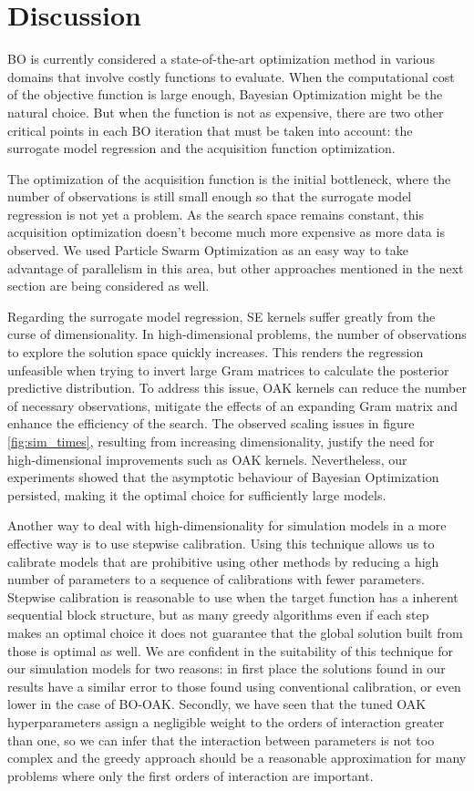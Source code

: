 \documentclass{IOS-Book-Article}
\begin{document}
	\section{Discussion}
	BO is currently considered a state-of-the-art optimization method in various domains that involve costly functions to evaluate. When the computational cost of the objective function is large enough, Bayesian Optimization might be the natural choice. But when the function is not as expensive, there are two other critical points in each BO iteration that must be taken into account: the surrogate model regression and the acquisition function optimization.
	
	The optimization of the acquisition function is the initial bottleneck, where the number of observations is still small enough so that the surrogate model regression is not yet a problem. As the search space remains constant, this acquisition optimization doesn't become much more expensive as more data is observed. We used Particle Swarm Optimization as an easy way to take advantage of parallelism in this area, but other approaches mentioned in the next section are being considered as well\cite{acquisition-functions}.
	
	Regarding the surrogate model regression, SE kernels suffer greatly from the curse of dimensionality. In high-dimensional problems, the number of observations to explore the solution space quickly increases. This renders the regression unfeasible when trying to invert large Gram matrices to calculate the posterior predictive distribution. To address this issue, OAK kernels can reduce the number of necessary observations, mitigate the effects of an expanding Gram matrix and enhance the efficiency of the search. The observed scaling issues in figure \ref{fig:sim_times}, resulting from increasing dimensionality, justify the need for high-dimensional improvements such as OAK kernels. Nevertheless, our experiments showed that the asymptotic behaviour of Bayesian Optimization persisted, making it the optimal choice for sufficiently large models.
	
	Another way to deal with high-dimensionality for simulation models in a more effective way is to use stepwise calibration. Using this technique allows us to calibrate models that are prohibitive using other methods by reducing a high number of parameters to a sequence of calibrations with fewer parameters. Stepwise calibration is reasonable to use when the target function has a inherent sequential block structure, but as many greedy algorithms even if each step makes an optimal choice it does not guarantee that the global solution built from those is optimal as well. We are confident in the suitability of this technique for our simulation models for two reasons: in first place the solutions found in our results have a similar error to those found using conventional calibration, or even lower in the case of BO-OAK. Secondly, we have seen that the tuned OAK hyperparameters assign a negligible weight to the orders of interaction greater than one, so we can infer that the interaction between parameters is not too complex and the greedy approach should be a reasonable approximation for many problems where only the first orders of interaction are important\cite{gp-additive}.
	
\end{document}
